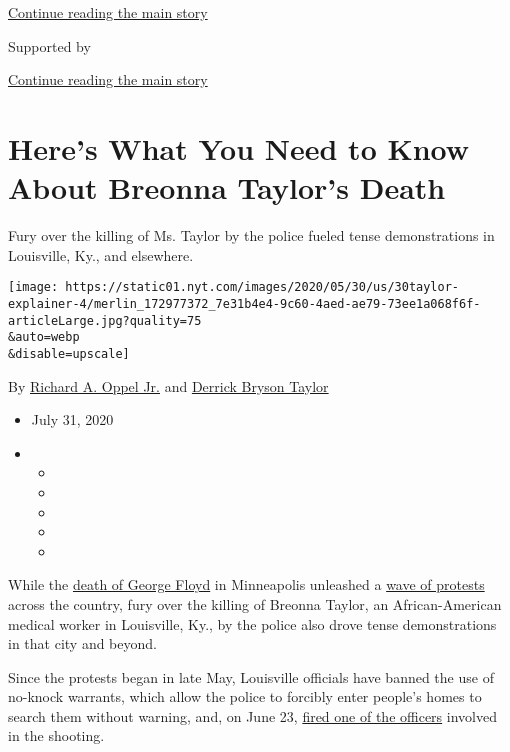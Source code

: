 \protect\hyperlink{after-top}{Continue reading the main story}

Supported by

\protect\hyperlink{after-sponsor}{Continue reading the main story}

\hypertarget{heres-what-you-need-to-know-about-breonna-taylors-death}{%
\section{Here's What You Need to Know About Breonna Taylor's
Death}\label{heres-what-you-need-to-know-about-breonna-taylors-death}}

Fury over the killing of Ms. Taylor by the police fueled tense
demonstrations in Louisville, Ky., and elsewhere.

\texttt{[image: https://static01.nyt.com/images/2020/05/30/us/30taylor-explainer-4/merlin\_172977372\_7e31b4e4-9c60-4aed-ae79-73ee1a068f6f-articleLarge.jpg?quality=75\\\&auto=webp\\\&disable=upscale]}

By \href{https://www.nytimes.com/by/richard-a-oppel-jr}{Richard A. Oppel
Jr.} and \href{https://www.nytimes.com/by/derrick-bryson-taylor}{Derrick
Bryson Taylor}

\begin{itemize}
\item
  July 31, 2020
\item
  \begin{itemize}
  \item
  \item
  \item
  \item
  \item
  \end{itemize}
\end{itemize}

While the
\href{https://www.nytimes.com/2020/05/29/us/minneapolis-police-george-floyd.html}{death
of George Floyd} in Minneapolis unleashed a
\href{https://www.nytimes.com/news-event/george-floyd-protests-minneapolis-new-york-los-angeles}{wave
of protests} across the country, fury over the killing of Breonna
Taylor, an African-American medical worker in Louisville, Ky., by the
police also drove tense demonstrations in that city and beyond.

Since the protests began in late May, Louisville officials have banned
the use of no-knock warrants, which allow the police to forcibly enter
people's homes to search them without warning, and, on June 23,
\href{https://www.nytimes.com/2020/06/23/us/breonna-taylor-brett-hankison-fired.html}{fired
one of the officers} involved in the shooting.

